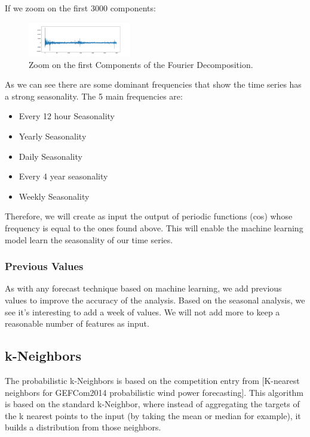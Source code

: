 \documentclass[a4paper,twocolumn,5p]{elsarticle}
\begin{document}
If we zoom on the first 3000 components:

\begin{figure}
  \caption{Zoom on the first Components of the Fourier Decomposition.}
  \centering
  \includegraphics[width=0.4\textwidth]{decompositionzoom}
\end{figure}


As we can see there are some dominant frequencies that show the time series has a strong seasonality. The 5 main 
frequencies are:

\begin{itemize}
  \item Every 12 hour Seasonality
  \item Yearly Seasonality
  \item Daily Seasonality
  \item Every 4 year seasonality
  \item Weekly Seasonality
\end{itemize} 

Therefore, we will create as input the output of periodic functions (cos) whose frequency is equal to the ones found 
above. This will enable the machine learning model learn the seasonality of our time series.

\subsubsection{Previous Values}

As with any forecast technique based on machine learning, we add previous values to improve the accuracy 
of the analysis. Based on the seasonal analysis, we see it's interesting to add a week of values. We will not 
add more to keep a reasonable number of features as input.

\subsection{k-Neighbors}

The probabilistic k-Neighbors is based on the competition entry from 
[K-nearest neighbors for GEFCom2014 probabilistic wind power forecasting]. 
This algorithm is based on the standard k-Neighbor, where instead of aggregating the targets of the
k nearest points to the input (by taking the mean or median for example), it builds a distribution 
from those neighbors.
\end{document}
